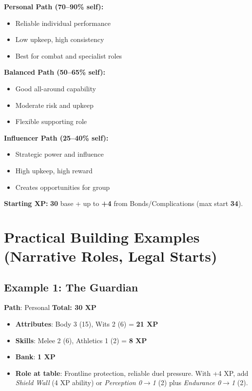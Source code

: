 \begin{tcolorbox}[colback=green!5!white,colframe=green!75!black,title=XP Path Quick Reference,fonttitle=\bfseries]
\textbf{Personal Path (70--90\% self):}
\begin{itemize}
\item Reliable individual performance
\item Low upkeep, high consistency
\item Best for combat and specialist roles
\end{itemize}

\textbf{Balanced Path (50--65\% self):}
\begin{itemize}
\item Good all-around capability
\item Moderate risk and upkeep
\item Flexible supporting role
\end{itemize}

\textbf{Influencer Path (25--40\% self):}
\begin{itemize}
\item Strategic power and influence
\item High upkeep, high reward
\item Creates opportunities for group
\end{itemize}

\textbf{Starting XP:} \textbf{30} base \;+\; up to \textbf{+4} from Bonds/Complications (max start \textbf{34}).
\end{tcolorbox}

\section{Practical Building Examples (Narrative Roles, Legal Starts)}

\subsection*{Example 1: The Guardian}
\textbf{Path}: Personal \quad \textbf{Total: 30 XP}
\begin{itemize}
\item \textbf{Attributes}: Body 3 (15), Wits 2 (6) = \textbf{21 XP}
\item \textbf{Skills}: Melee 2 (6), Athletics 1 (2) = \textbf{8 XP}
\item \textbf{Bank}: \textbf{1 XP}
\item \textbf{Role at table}: Frontline protection, reliable duel pressure. With +4 XP, add \emph{Shield Wall} (4 XP ability) or \emph{Perception 0$\to$1} (2) plus \emph{Endurance 0$\to$1} (2).
\end{itemize}


